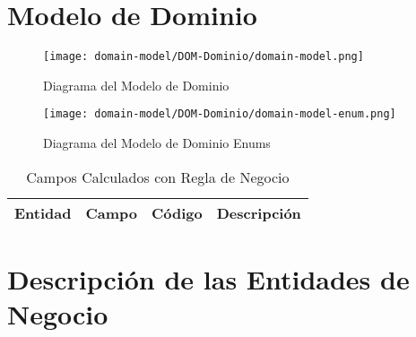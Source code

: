 \clearpage
\section{Modelo de Dominio} \label{sec:dom-dominio}
\begin{figure}[H]
\begin{center}
	\label{tab:uml-domain-model}
	\texttt{[image: domain-model/DOM-Dominio/domain-model.png]}
	\caption{Diagrama del Modelo de Dominio}
\end{center}
\end{figure}
\begin{figure}[H]
		\begin{center}
			\label{tab:uml-domain-model}
			\texttt{[image: domain-model/DOM-Dominio/domain-model-enum.png]}
			\caption{Diagrama del Modelo de Dominio Enums}
		\end{center}
\end{figure}
\begin{table}[H]
			\caption{Campos Calculados con Regla de Negocio}
			\label{tab:entities}
			\begin{center}
			\begin{tabularx}{0.90\linewidth}{ X X X X}
				\hline
				\textbf{Entidad} & \textbf{Campo} & \textbf{C\'odigo} & \textbf{Descripci\'on} \\
				\hline
				\hline
			\end{tabularx}
			\end{center}
\end{table}

\clearpage
\section{Descripci\'on de las Entidades de Negocio} \label{sec:dom-entities-dominio}


